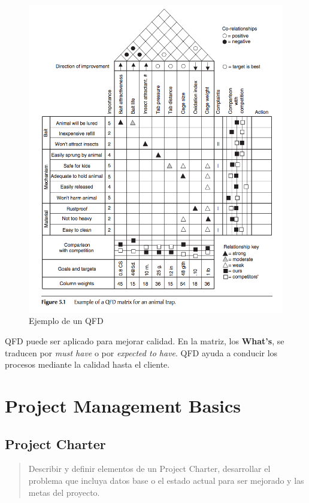 \documentclass[oneside]{book}
\begin{document}
\begin{figure}[ht!]
	\centering
	\includegraphics[width=150mm]{imagenes/ExampleQFD.png}
	\caption{Ejemplo de un QFD}
	\label{fig:ExampleQFD}
\end{figure}

QFD puede ser aplicado para mejorar calidad. En la matriz, los \textbf{What's}, se traducen por \textit{must have} o por \textit{expected to have}. QFD ayuda a conducir los procesos mediante la calidad hasta el cliente.

\chapter{Project Management Basics}

\section{Project Charter}

\begin{quote}
Describir y definir elementos de un Project Charter, desarrollar el problema que incluya datos base o el estado actual para ser mejorado y las metas del proyecto.
\end{quote}
\end{document}
